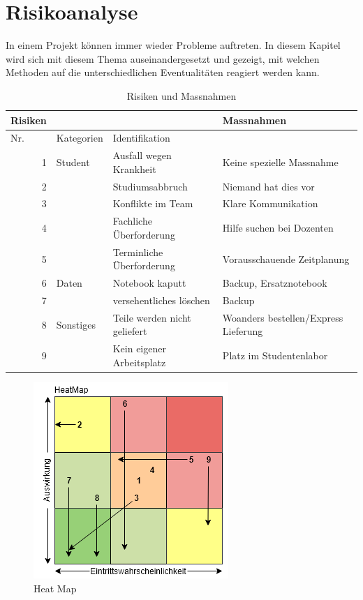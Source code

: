 \section{Risikoanalyse}
In einem Projekt können immer wieder Probleme auftreten. In diesem Kapitel wird sich mit diesem Thema auseinandergesetzt und gezeigt, mit welchen Methoden auf die unterschiedlichen Eventualitäten reagiert werden kann.\\


\begin{table}[htbp]
  \centering
  \caption{Risiken und Massnahmen}
    \begin{tabular}{|r|r|l|l|}
    \toprule
    \multicolumn{1}{|l}{\textbf{Risiken}} & \multicolumn{1}{r}{} &       & \textbf{Massnahmen} \\
    \hline
    \multicolumn{1}{|l|}{Nr.} & \multicolumn{1}{l|}{Kategorien} & Identifikation &  \\
    \hline
    1     & \multicolumn{1}{l|}{Student} & Ausfall wegen Krankheit & Keine spezielle Massnahme \\
\cline{1-1}\cline{3-4}    2     &       & Studiumsabbruch & Niemand hat dies vor \\
\cline{1-1}\cline{3-4}    3     &       & Konflikte im Team & Klare Kommunikation \\
\cline{1-1}\cline{3-4}    4     &       & Fachliche Überforderung & Hilfe suchen bei Dozenten \\
\cline{1-1}\cline{3-4}    5     &       & Terminliche Überforderung & Vorausschauende Zeitplanung \\
    \hline
    6     & \multicolumn{1}{l|}{Daten} & Notebook kaputt & Backup, Ersatznotebook \\
\cline{1-1}\cline{3-4}    7     &       & versehentliches löschen & Backup \\
    \hline
    8     & \multicolumn{1}{l|}{Sonstiges} & Teile werden nicht geliefert & Woanders bestellen/Express Lieferung\\
\cline{1-1}\cline{3-4}    9     &       & Kein eigener Arbeitsplatz & Platz im Studentenlabor \\
    \bottomrule
    \end{tabular}%
  \label{tab:RisikenUndMassnahmen}%
\end{table}%

\begin{figure}[h]
\centering
\includegraphics[scale=1]{graphics/HeatMap.PNG}
\caption{Heat Map}
\end{figure}

